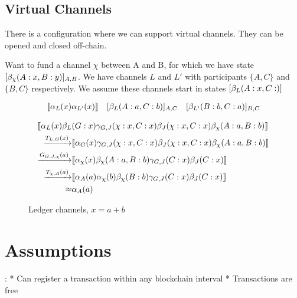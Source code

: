 \subsection{Virtual Channels}

There is a configuration where we can support virtual channels.
They can be opened and closed off-chain.

Want to fund a channel $\chi$ between A and B, for which we have state $[\beta_\chi(A: x, B:y)]_{A,B}$. We have channels $L$ and $L'$ with participants $\{A, C\}$ and $\{B, C\}$ respectively. We assume these channels start in states $[\beta_L(A:x, C:)]$

\begin{align*}
  \llbracket \alpha_L(x)\alpha_{L'}(x) \rrbracket \quad [\beta_L(A: a, C: b)]_{A,C} \quad [\beta_{L'}(B:b, C:a)]_{B, C}
\end{align*}

\begin{align*}
  & \llbracket \alpha_L(x)\beta_L(G: x)\gamma_{G,J}(\chi: x, C: x)\beta_J(\chi: x, C: x)\beta_\chi(A: a, B: b) \rrbracket\\ 
  & \begin{aligned}
   \xrightarrow{T_{L,G}(x)} & \llbracket \alpha_G(x)\gamma_{G, J}(\chi: x, C: x)\beta_J(\chi: x, C: x)\beta_\chi(A: a, B: b) \rrbracket \\
   \xrightarrow{G_{G, J, \chi}(a)} & \llbracket \alpha_\chi(x)\beta_\chi(A: a, B: b)\gamma_{G, J}(C: x)\beta_J(C: x) \rrbracket \\
   \xrightarrow{T_{\chi, A}(a)} & \llbracket \alpha_A(a)\alpha_\chi(b)\beta_\chi(B: b)\gamma_{G, J}(C: x)\beta_J(C: x) \rrbracket \\
   \approx & \alpha_A(a)
  \end{aligned}
\end{align*}




\begin{figure}[h]\centering
\caption{Ledger channels, $x = a + b$}\label{fig:modes}
\end{figure}

\section{Assumptions}:
* Can register a transaction within any blockchain interval
* Transactions are free


